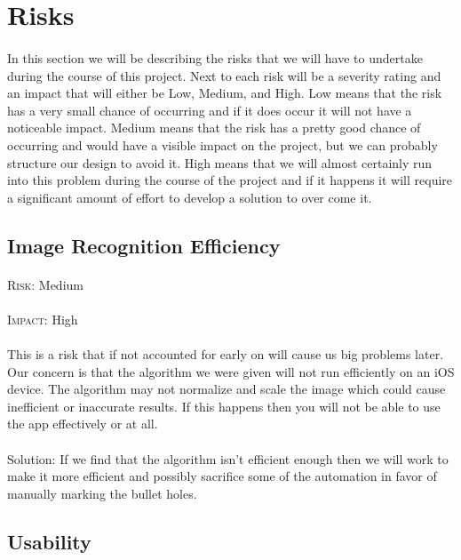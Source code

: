 \section{Risks}
\paragraph{}In this section we will be describing the risks that we will have to undertake during the course of this project. Next to each risk will be a severity rating and an impact that will either be Low, Medium, and High. Low means that the risk has a very small chance of occurring and if it does occur it will not have a noticeable impact. Medium means that the risk has a pretty good chance of occurring and would have a visible impact on the project, but we can probably structure our design to avoid it. High means that we will almost certainly run into this problem during the course of the project and if it happens it will require a significant amount of effort to develop a solution to over come it.

\subsection{Image Recognition Efficiency}
\paragraph{}\textsc{Risk:} Medium
\paragraph{}\textsc{Impact:} High
\paragraph{} This is a risk that if not accounted for early on will cause us big problems later. Our concern is that the algorithm we were given will not run efficiently on an iOS device. The algorithm may not normalize and scale the image which could cause inefficient or inaccurate results. If this happens then you will not be able to use the app effectively or at all.
\\
\\Solution: If we find that the algorithm isn't efficient enough then we will work to make it more efficient and possibly sacrifice some of the automation in favor of manually marking the bullet holes.

\subsection{Usability}
